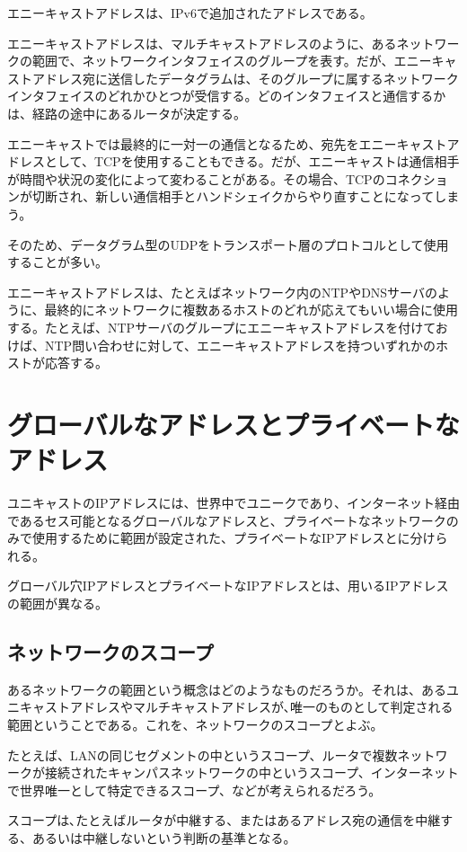 エニーキャストアドレスは、IPv6で追加されたアドレスである。

エニーキャストアドレスは、マルチキャストアドレスのように、あるネットワークの範囲で、ネットワークインタフェイスのグループを表す。だが、エニーキャストアドレス宛に送信したデータグラムは、そのグループに属するネットワークインタフェイスのどれかひとつが受信する。どのインタフェイスと通信するかは、経路の途中にあるルータが決定する。

エニーキャストでは最終的に一対一の通信となるため、宛先をエニーキャストアドレスとして、TCPを使用することもできる。だが、エニーキャストは通信相手が時間や状況の変化によって変わることがある。その場合、TCPのコネクションが切断され、新しい通信相手とハンドシェイクからやり直すことになってしまう。

そのため、データグラム型のUDPをトランスポート層のプロトコルとして使用することが多い。

エニーキャストアドレスは、たとえばネットワーク内のNTPやDNSサーバのように、最終的にネットワークに複数あるホストのどれが応えてもいい場合に使用する。たとえば、NTPサーバのグループにエニーキャストアドレスを付けておけば、NTP問い合わせに対して、エニーキャストアドレスを持ついずれかのホストが応答する。

\section{グローバルなアドレスとプライベートなアドレス}

ユニキャストのIPアドレスには、世界中でユニークであり、インターネット経由であるセス可能となるグローバルなアドレスと、プライベートなネットワークのみで使用するために範囲が設定された、プライベートなIPアドレスとに分けられる。

グローバル穴IPアドレスとプライベートなIPアドレスとは、用いるIPアドレスの範囲が異なる。

\subsection{ネットワークのスコープ}
あるネットワークの範囲という概念はどのようなものだろうか。それは、あるユニキャストアドレスやマルチキャストアドレスが､唯一のものとして判定される範囲ということである。これを、ネットワークのスコープとよぶ。

たとえば、LANの同じセグメントの中というスコープ、ルータで複数ネットワークが接続されたキャンパスネットワークの中というスコープ、インターネットで世界唯一として特定できるスコープ、などが考えられるだろう。

スコープは､たとえばルータが中継する、またはあるアドレス宛の通信を中継する、あるいは中継しないという判断の基準となる。

